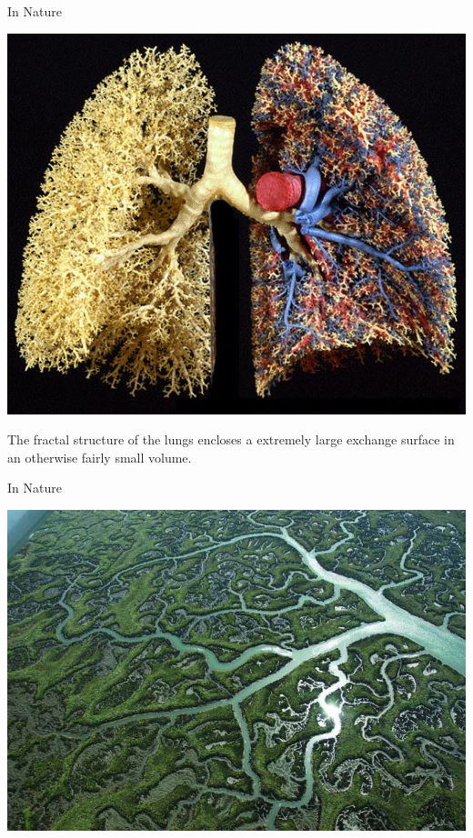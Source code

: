 \documentclass[usenames, dvipsnames, aspectratio=169]{beamer}
\begin{document}
\begin{frame}[t, c]{In Nature}{}
  \vfill
  \large

  \begin{minipage}{.48\textwidth}
    \centering
    \includegraphics[width=\textwidth]{poumons}
  \end{minipage}%
  \hfill
  \begin{minipage}{.48\textwidth}
    The fractal structure of the lungs encloses a extremely large exchange surface in an otherwise fairly small volume.
  \end{minipage}

  \vfill
\end{frame}

\begin{frame}[t, c]{In Nature}{}
  \vfill
  \centering

  \includegraphics[width=.666\textwidth]{river}

  \vfill
\end{frame}
\end{document}
